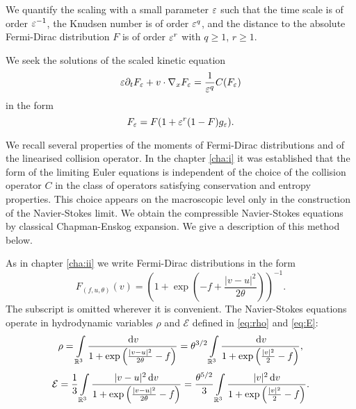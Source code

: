 We quantify the scaling with a small parameter ${\varepsilon}$ such that the time scale is
of order ${\varepsilon}^{-1}$, the Knudsen number is of order ${\varepsilon}^q$, and
the distance to the absolute Fermi-Dirac distribution $F$ is of order
${\varepsilon}^r$ with $q\ge 1$, $r\ge 1$.

We seek the solutions of the scaled kinetic equation  
\begin{equation}{\varepsilon}\partial_t F_{\varepsilon}+ v\cdot\nabla_x F_{\varepsilon} =
\frac{1}{{\varepsilon}^q}C(F_{\varepsilon})\label{eq:inc}\end{equation}
in the form
\begin{equation}F_{\varepsilon} = F(1+{\varepsilon}^r(1-F)g_{\varepsilon}).\label{eq:incsol}
\end{equation}

We recall several properties of the moments of Fermi-Dirac distributions and of the linearised collision operator. In the chapter \ref{cha:i} it was established that the form of the limiting Euler equations is 
independent of the choice of the collision operator $C$ in the class of 
operators satisfying conservation and entropy properties. This choice appears on 
the macroscopic level only in the construction of the Navier-Stokes limit. We 
obtain the compressible Navier-Stokes equations by classical Chapman-Enskog 
expansion. We give a description of this method below.

As in chapter \ref{cha:ii} we 
 write Fermi-Dirac distributions in the form
\begin{equation*}%
F_{(f,u,\theta)}(v) =
\left(1+\exp\left(-f+\frac{|v-u|^2}{2\theta}\right)\right)^{
-1}.\end{equation*}%
The subscript is omitted wherever it is convenient.
The Navier-Stokes equations operate in hydrodynamic variables  $\rho$ and $\mathcal E$ defined in \eqref{eq:rho} and \eqref{eq:E}:
\begin{equation*}
\rho = \int\limits_{\mathbb R^3} \frac{{\,\mathrm{d} v}}{1+\exp\left(\frac{|v-u|^2}{2\theta}-f\right)} =  \theta^{3/2}\int\limits_{\mathbb R^3} \frac{{\,\mathrm{d} v}}{1+\exp\left(\frac{|v|^2}{2}-f\right)},
 \end{equation*}
\begin{equation*}%
\mathcal E = \frac 13\int\limits_{\mathbb R^3} \frac{|v-u|^2\dv}{1+\exp\left(\frac{|v-u|^2}{2\theta}-f\right)} = \frac {\theta^{5/2}}{3}\int\limits_{\mathbb R^3} \frac{|v |^2\dv}{1+\exp\left(\frac{|v |^2}{2 }-f\right)}.
\end{equation*}

